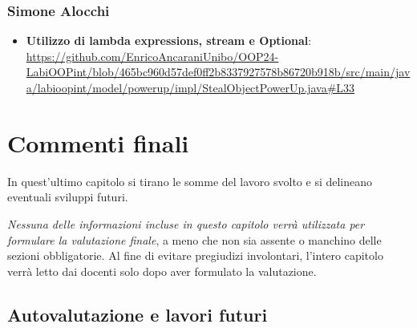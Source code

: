\documentclass[a4paper,12pt]{report}
\begin{document}
\subsection{Simone Alocchi}
\begin{itemize}
	\item \textbf{Utilizzo di lambda expressions, stream e Optional}: \url{https://github.com/EnricoAncaraniUnibo/OOP24-LabiOOPint/blob/465bc960d57def0ff2b8337927578b86720b918b/src/main/java/labioopint/model/powerup/impl/StealObjectPowerUp.java#L33}
\end{itemize}

\chapter{Commenti finali}

In quest'ultimo capitolo si tirano le somme del lavoro svolto e si delineano eventuali sviluppi
futuri.

\textit{Nessuna delle informazioni incluse in questo capitolo verrà utilizzata per formulare la valutazione finale}, a meno che non sia assente o manchino delle sezioni obbligatorie.
%
Al fine di evitare pregiudizi involontari, l'intero capitolo verrà letto dai docenti solo dopo aver formulato la valutazione.

\section{Autovalutazione e lavori futuri}
\end{document}
